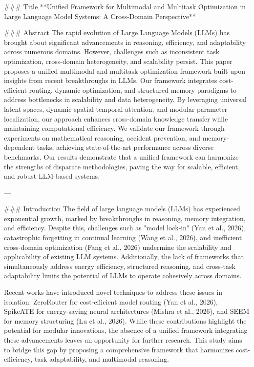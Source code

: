 ### Title  
**Unified Framework for Multimodal and Multitask Optimization in Large Language Model Systems: A Cross-Domain Perspective**

### Abstract  
The rapid evolution of Large Language Models (LLMs) has brought about significant advancements in reasoning, efficiency, and adaptability across numerous domains. However, challenges such as inconsistent task optimization, cross-domain heterogeneity, and scalability persist. This paper proposes a unified multimodal and multitask optimization framework built upon insights from recent breakthroughs in LLMs. Our framework integrates cost-efficient routing, dynamic optimization, and structured memory paradigms to address bottlenecks in scalability and data heterogeneity. By leveraging universal latent spaces, dynamic spatial-temporal attention, and modular parameter localization, our approach enhances cross-domain knowledge transfer while maintaining computational efficiency. We validate our framework through experiments on mathematical reasoning, accident prevention, and memory-dependent tasks, achieving state-of-the-art performance across diverse benchmarks. Our results demonstrate that a unified framework can harmonize the strengths of disparate methodologies, paving the way for scalable, efficient, and robust LLM-based systems.

---

### Introduction  
The field of large language models (LLMs) has experienced exponential growth, marked by breakthroughs in reasoning, memory integration, and efficiency. Despite this, challenges such as "model lock-in" (Yan et al., 2026), catastrophic forgetting in continual learning (Wang et al., 2026), and inefficient cross-domain optimization (Fang et al., 2026) undermine the scalability and applicability of existing LLM systems. Additionally, the lack of frameworks that simultaneously address energy efficiency, structured reasoning, and cross-task adaptability limits the potential of LLMs to operate cohesively across domains.

Recent works have introduced novel techniques to address these issues in isolation: ZeroRouter for cost-efficient model routing (Yan et al., 2026), SpikeATE for energy-saving neural architectures (Mishra et al., 2026), and SEEM for memory structuring (Lu et al., 2026). While these contributions highlight the potential for modular innovations, the absence of a unified framework integrating these advancements leaves an opportunity for further research. This study aims to bridge this gap by proposing a comprehensive framework that harmonizes cost-efficiency, task adaptability, and multimodal reasoning.

